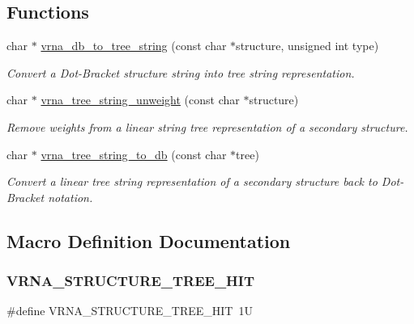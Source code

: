 \subsection*{Functions}
\begin{DoxyCompactItemize}
\item 
char $\ast$ \mbox{\hyperlink{group__struct__utils__tree_ga56551ab7da64933a7230d29430f40cfe}{vrna\+\_\+db\+\_\+to\+\_\+tree\+\_\+string}} (const char $\ast$structure, unsigned int type)
\begin{DoxyCompactList}\small\item\em Convert a Dot-\/\+Bracket structure string into tree string representation. \end{DoxyCompactList}\item 
char $\ast$ \mbox{\hyperlink{group__struct__utils__tree_gaa31da26a3f582ddc35a84ff1b9c0a2b0}{vrna\+\_\+tree\+\_\+string\+\_\+unweight}} (const char $\ast$structure)
\begin{DoxyCompactList}\small\item\em Remove weights from a linear string tree representation of a secondary structure. \end{DoxyCompactList}\item 
char $\ast$ \mbox{\hyperlink{group__struct__utils__tree_ga99d280319a7fd3f87e9f0d8c44520774}{vrna\+\_\+tree\+\_\+string\+\_\+to\+\_\+db}} (const char $\ast$tree)
\begin{DoxyCompactList}\small\item\em Convert a linear tree string representation of a secondary structure back to Dot-\/\+Bracket notation. \end{DoxyCompactList}\end{DoxyCompactItemize}


\subsection{Macro Definition Documentation}
\mbox{\label{group__struct__utils__tree_ga3ad5609bc93ef20034c3ab989365c1f0}} 
\subsubsection{\texorpdfstring{VRNA\_STRUCTURE\_TREE\_HIT}{VRNA\_STRUCTURE\_TREE\_HIT}}
{\footnotesize\ttfamily \#define V\+R\+N\+A\+\_\+\+S\+T\+R\+U\+C\+T\+U\+R\+E\+\_\+\+T\+R\+E\+E\+\_\+\+H\+IT~1U}



